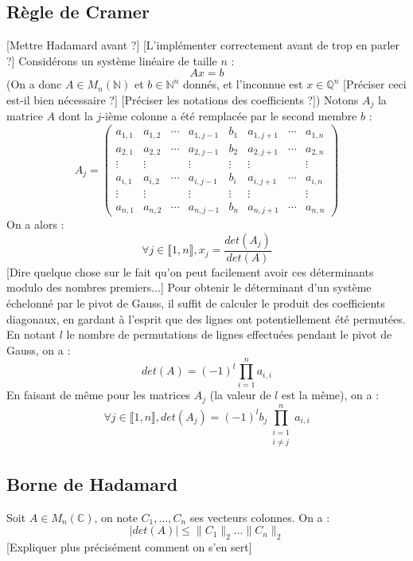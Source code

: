 \documentclass[french]{article}
\begin{document}
\subsection{Règle de Cramer}
[Mettre Hadamard avant ?] [L'implémenter correctement avant de trop en parler ?]
\newline
Considérons un système linéaire de taille $n$ :
$$ A x = b$$
(On a donc $A \in M_n(\mathbb{N})$ et $b \in \mathbb{N}^n$ donnés, et l'inconnue est $x \in \mathbb{Q}^n$ [Préciser ceci est-il bien nécessaire ?] [Préciser les notations des coefficients ?])
\newline
Notons $A_j$ la matrice $A$ dont la $j$-ième colonne a été remplacée par le second membre $b$ :
\begin{equation*}
	A_j = 
	\begin{pmatrix}
		a_{1,1} & a_{1,2} & \cdots & a_{1,j-1} & b_1 & a_{1,j+1} & \cdots & a_{1,n}\\
		a_{2,1} & a_{2,2} & \cdots & a_{2,j-1} & b_2 & a_{2,j+1} & \cdots & a_{2,n}\\
		\vdots  & \vdots  & & \vdots & \vdots & \vdots & & \vdots\\
		a_{i,1} & a_{i,2} & \cdots & a_{i,j-1} & b_i & a_{i,j+1} & \cdots & a_{i,n}\\
		\vdots  & \vdots  & & \vdots & \vdots & \vdots & & \vdots\\
		a_{n,1} & a_{n,2} & \cdots & a_{n,j-1} & b_n & a_{n,j+1} &\cdots & a_{n,n}
	\end{pmatrix}
\end{equation*}
On a alors :
$$ \forall j \in \llbracket1,n\rrbracket, x_j = \frac{det(A_j)}{det(A)}$$
[Dire quelque chose sur le fait qu'on peut facilement avoir ces déterminants modulo des nombres premiers...]
\newline
\newline
Pour obtenir le déterminant d'un système échelonné par le pivot de Gauss, il suffit de calculer le produit des coefficients diagonaux, en gardant à l'esprit que des lignes ont potentiellement été permutées. En notant $l$ le nombre de permutations de lignes effectuées pendant le pivot de Gauss, on a :
$$ det(A) = (-1)^l\prod_{i = 1}^na_{i,i}$$
En faisant de même pour les matrices $A_j$ (la valeur de $l$ est la même), on a :
$$ \forall j \in \llbracket1,n\rrbracket, det(A_j) = (-1)^l b_j \prod_{\substack{i=1 \\ i\neq j}}^na_{i,i}$$
\subsection{Borne de Hadamard}
Soit $A \in M_n(\mathbb{C})$, on note $C_1,\hdots,C_n$ ses vecteurs colonnes. On a :
$$ \lvert det(A) \rvert \le \lVert C_1 \rVert_2 \hdots \lVert C_n \rVert_2$$
[Expliquer plus précisément comment on s'en sert]
\end{document}
